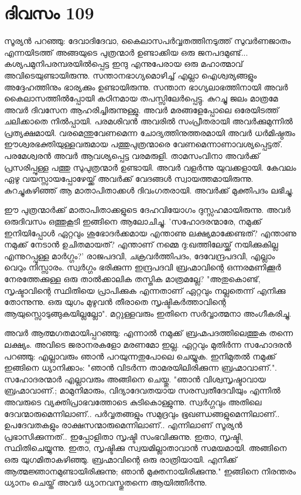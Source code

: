 \newpage
\section{ദിവസം 109}


സൂര്യന്‍ പറഞ്ഞു: ദേവാദിദേവാ, കൈലാസപര്‍വ്വതത്തിനടുത്ത്‌ സുവര്‍ണജാതം എന്നയിടത്ത്‌ അങ്ങയുടെ പുത്രന്മാര്‍ ഉണ്ടാക്കിയ ഒരു ജനപദമുണ്ട്‌... കശ്യപമുനിപരമ്പരയില്‍പ്പെട്ട ഇന്ദു എന്നുപേരായ ഒരു മഹാത്മാവ്‌ അവിടെയുണ്ടായിരുന്നു. സന്താനഭാഗ്യമൊഴിച്ച്‌ എല്ലാ ഐശ്വര്യങ്ങളും അദ്ദേഹത്തിനും ഭാര്യക്കും ഉണ്ടായിരുന്നു. സന്താന ഭാഗ്യലാഭത്തിനായി അവര്‍ കൈലാസത്തില്‍പ്പോയി കഠിനമായ തപസ്സിലേര്‍പ്പെട്ടു. കുറച്ചു ജലം മാത്രമേ അവര്‍ ദിവസേന ആഹരിച്ചിരുന്നുള്ളു. അവര്‍ മരങ്ങളേപ്പോലെ ഒരേയിടത്ത്‌ ചലിക്കാതെ നില്‍പ്പായി. പരമശിവന്‍ അവരില്‍ സംപ്രീതരായി അവര്‍ക്കുമുന്നില്‍ പ്രത്യക്ഷമായി. വരമെന്തുവേണമെന്ന ചോദ്യത്തിനുത്തരമായി അവര്‍  ധര്‍മിഷ്ഠരും ഈശ്വരഭക്തിയുള്ളവരുമായ പത്തുപുത്രന്മാരെ വേണമെന്നാണാവശ്യപ്പെട്ടത്‌. പരമേശ്വരന്‍ അവര്‍ ആവശ്യപ്പെട്ട വരമരുളി. താമസംവിനാ അവര്‍ക്ക്‌ പ്രസരിപ്പുള്ള പത്തു സുപുത്രന്മാര്‍ ഉണ്ടായി. അവര്‍ വളര്‍ന്നു യുവക്കളായി. കേവലം ഏഴു വയസ്സായപ്പോഴേയ്ക്ക്‌ അവര്‍ക്ക്‌ വേദങ്ങള്‍ സ്വായത്തമായിരുന്നു. കുറച്ചുകഴിഞ്ഞ്‌ ആ മാതാപിതാക്കള്‍ ദിവംഗതരായി. അവര്‍ക്ക്‌ മുക്തിപദം ലഭിച്ചു.

ഈ പുത്രന്മാര്‍ക്ക്‌ മാതാപിതാക്കളുടെ ദേഹവിയോഗം ദുസ്സഹമായിരുന്നു. അവര്‍ ഒരുദിവസം ഒത്തുകൂടി ഇങ്ങിനെ ആലോചിച്ചു. 'സഹോദരന്മാരേ, നമുക്ക്‌ ഇനിയിപ്പോള്‍ ഏറ്റവും ശുഭോദര്‍ക്കമായ എന്താണു ലക്ഷ്യമാക്കേണ്ടത്‌? എന്താണു നമുക്ക്‌ നേടാന്‍ ഉചിതമായത്‌? എന്താണ്‌ നമ്മെ ദു:ഖത്തിലേയ്ക്ക്‌ നയിക്കുകില്ല എന്നുറപ്പുള്ള മാര്‍ഗ്ഗം?' രാജപദവി, ചക്രവര്‍ത്തിപദം, ദേവേന്ദ്രപദവി, എല്ലാം വെറും നിസ്സാരം. സ്വര്‍ഗ്ഗം ഭരിക്കുന്ന ഇന്ദ്രപദവി ബ്രഹ്മാവിന്റെ ഒന്നരമണിക്കൂര്‍ നേരത്തേക്കുള്ള ഒരു താല്‍ക്കാലിക തസ്തിക മാത്രമല്ലേ? "അതുകൊണ്ട്‌, സൃഷ്ടാവിന്റെ സ്ഥിതിയെ പ്രാപിക്കുക എന്നതാണ്‌ ഏറ്റവും നല്ലതെന്ന് എനിക്കു തോന്നുന്നു. ഒരു യുഗം മുഴുവന്‍ തീരാതെ സൃഷ്ടികര്‍ത്താവിന്റെ ആയുസ്സൊടുങ്ങുകയില്ലല്ലോ". മറ്റുള്ളവരും ഇതിനെ സര്‍വ്വാത്മനാ അംഗീകരിച്ചു.

അവര്‍ ആത്മഗതമായിപ്പറഞ്ഞു: എന്നാല്‍ നമുക്ക്‌ ബ്രഹ്മപദത്തിലെത്തുക തന്നെ ലക്ഷ്യം. അവിടെ ജരാനരകളോ മരണമോ ഇല്ല. ഏറ്റവും മുതിര്‍ന്ന സഹോദരന്‍ പറഞ്ഞു: എല്ലാവരും ഞാന്‍ പറയുന്നതുപോലെ ചെയ്യുക. ഇനിമുതല്‍ നമുക്ക്‌ ഇങ്ങിനെ ധ്യാനിക്കാം: "ഞാന്‍ വിടര്‍ന്ന താമരയിലിരിക്കുന്ന ബ്രഹ്മാവാണ്‌.". സഹോദരന്മാര്‍ എല്ലാവരും അങ്ങിനെ ചെയ്തു. "ഞാന്‍ വിശ്വസൃഷ്ടാവായ ബ്രഹ്മാവാണ്‌.; മാമുനിമാരും, വിദ്യാദേവതയായ സരസ്വതീദേവിയും എന്നില്‍ അവരുടെ വ്യക്തിപ്രാഭവത്തോടെ കുടികൊള്ളുന്നു. സ്വര്‍ഗ്ഗവും അതിലെ ദേവന്മാരുമെന്നിലാണ്‌.. പര്‍വ്വതങ്ങളും സമുദ്രവും ഭൂഖണ്ഡങ്ങളുമെന്നിലാണ്‌.. ഉപദേവതകളും രാക്ഷസന്മാരുമെന്നിലാണ്‌.. എന്നിലാണ്‌ സൂര്യന്‍ പ്രഭാസിക്കുന്നത്‌.. ഇപ്പോളിതാ സൃഷ്ടി സംഭവിക്കുന്നു. ഇതാ, സൃഷ്ടി, സ്ഥിതിചെയ്യുന്നു. ഇതാ, സൃഷ്ടിക്കു സ്വയമില്ലാതാവാന്‍ സമയമായി. അങ്ങിനെ ഒരു യുഗമിതാകഴിഞ്ഞു. ബ്രഹ്മാവിന്റെ ഒരു രാത്രിയായി. എനിക്ക്‌ ആത്മജ്ഞാനമുണ്ടായിരിക്കുന്നു; ഞാന്‍ മുക്തനായിരിക്കുന്നു." ഇങ്ങിനെ നിരന്തരം ധ്യാനം ചെയ്ത്‌ അവര്‍ ധ്യാനവസ്തുതന്നെ ആയിത്തീര്‍ന്നു. 
